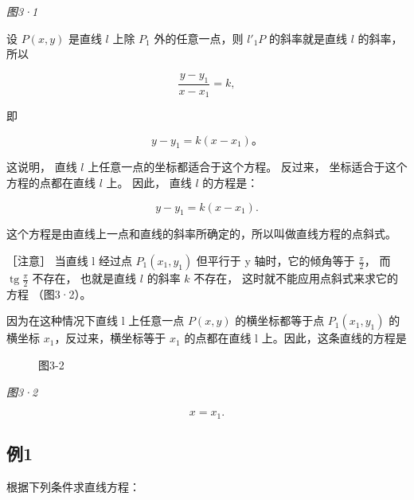 \emph{图3·1}

设 \(P(x, y)\) 是直线 \(l\) 上除 \(P_{1}\) 外的任意一点，则 \(l'_{1}P\)
的斜率就是直线 \(l\) 的斜率，所以

\[
\frac {y - y_{1}}{x - x_{1}} = k,
\]

即

\[
y - y_{1} = k (x - x_{1})\text{。}
\]

这说明， 直线 \(l\) 上任意一点的坐标都适合于这个方程。 反过来，
坐标适合于这个方程的点都在直线 \(l\) 上。 因此， 直线 \(l\) 的方程是：

\[
\boxed {y - y_{1} = k (x - x_{1}).}
\]

这个方程是由直线上一点和直线的斜率所确定的，所以叫做直线方程的点斜式。

［注意］ 当直线 l 经过点 \(P_{1}(x_{1}, y_{1})\) 但平行于 y
轴时，它的倾角等于 \(\frac{\pi}{2}\)， 而
\(\operatorname{tg} \frac{\pi}{2}\) 不存在， 也就是直线 \(l\) 的斜率
\(k\) 不存在， 这时就不能应用点斜式来求它的方程 （图3·2）。

因为在这种情况下直线 l 上任意一点 \(P(x,y)\) 的横坐标都等于点
\(P_{1}(x_{1},y_{1})\) 的横坐标 \(x_{1}\)，反过来，横坐标等于 \(x_{1}\)
的点都在直线 l 上。因此，这条直线的方程是

\begin{figure}
\centering
{}
\caption{图3-2}
\end{figure}

\emph{图3·2}

\[
x = x_{1}.
\]

\subsection{例1}\label{ux4f8b1-12}

根据下列条件求直线方程：

